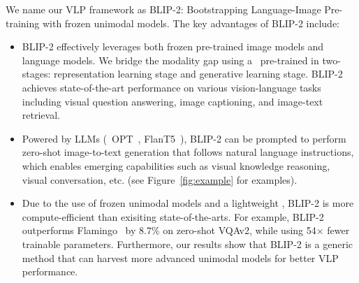 
We name our VLP framework as BLIP-2: Bootstrapping Language-Image Pre-training with frozen unimodal models.
The key advantages of BLIP-2 include:
\vspace{-\topsep}
\vspace{-0.5ex}
\begin{itemize} [leftmargin=*]
    \item BLIP-2 effectively leverages both frozen pre-trained image models and language models.
    We bridge the modality gap using a \name~pre-trained in two-stages: representation learning stage and generative learning stage.
    BLIP-2 achieves state-of-the-art performance on various vision-language tasks including visual question answering, image captioning, and image-text retrieval.
    \item
    Powered by LLMs (\eg~OPT~\cite{opt}, FlanT5~\cite{flanT5}), BLIP-2 can be prompted to perform zero-shot image-to-text generation that follows natural language instructions, which enables emerging capabilities such as visual knowledge reasoning, visual conversation, etc. (see Figure~\ref{fig:example} for examples).    
    \item
    Due to the use of frozen unimodal models and a lightweight \name,
    BLIP-2 is more compute-efficient than exisiting state-of-the-arts.
    For example, BLIP-2 outperforms Flamingo~\cite{flamingo} by 8.7\% on zero-shot VQAv2, while using 54$\times$ fewer trainable parameters.
    Furthermore,
    our results show that BLIP-2 is a generic method that can harvest more advanced unimodal models for better VLP performance.
\end{itemize}

